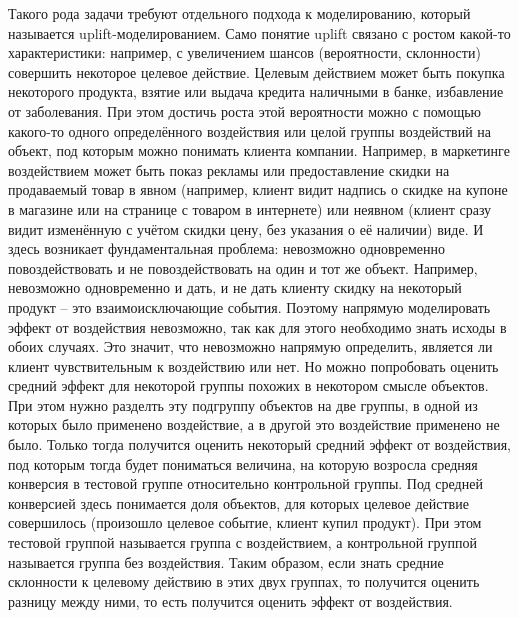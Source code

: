 \par
Такого рода задачи требуют отдельного подхода к моделированию, который называется uplift-моделированием. Само понятие uplift связано с ростом какой-то характеристики: например, с увеличением шансов (вероятности, склонности) совершить некоторое целевое действие. Целевым действием может быть покупка некоторого продукта, взятие или выдача кредита наличными в банке, избавление от заболевания. При этом достичь роста этой вероятности можно с помощью какого-то одного определённого воздействия или целой группы воздействий на объект, под которым можно понимать клиента компании. Например, в маркетинге воздействием может быть показ рекламы или предоставление скидки на продаваемый товар в явном (например, клиент видит надпись о скидке на купоне в магазине или на странице с товаром в интернете) или неявном (клиент сразу видит изменённую с учётом скидки цену, без указания о её наличии) виде. И здесь возникает фундаментальная проблема: невозможно одновременно повоздействовать и не повоздействовать на один и тот же объект. Например, невозможно одновременно и дать, и не дать клиенту скидку на некоторый продукт -- это взаимоисключающие события. Поэтому напрямую моделировать эффект от воздействия невозможно, так как для этого необходимо знать исходы в обоих случаях. Это значит, что невозможно напрямую определить, является ли клиент чувствительным к воздействию или нет. Но можно попробовать оценить средний эффект для некоторой группы похожих в некотором смысле объектов. При этом нужно разделть эту подгруппу объектов на две группы, в одной из которых было применено воздействие, а в другой это воздействие применено не было. Только тогда получится оценить некоторый средний эффект от воздействия, под которым тогда будет пониматься величина, на которую возросла средняя конверсия в тестовой группе относительно контрольной группы. Под средней конверсией здесь понимается доля объектов, для которых целевое действие совершилось (произошло целевое событие, клиент купил продукт). При этом тестовой группой называется группа с воздействием, а контрольной группой называется группа без воздействия. Таким образом, если знать средние склонности к целевому действию в этих двух группах, то получится оценить разницу между ними, то есть получится оценить эффект от воздействия.



\iffalse

проблема
возможно решение
основные понятия

\fi



